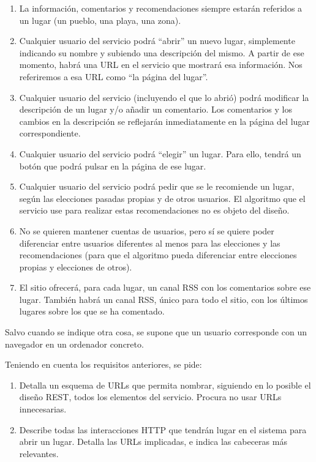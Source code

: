 {\begin{enumerate}
\item La información, comentarios y recomendaciones siempre estarán referidos a un lugar (un pueblo, una playa, una zona).
\item Cualquier usuario del servicio podrá ``abrir'' un nuevo lugar, simplemente indicando su nombre y subiendo una descripción del mismo. A partir de ese momento, habrá una URL en el servicio que  mostrará esa información. Nos referiremos a esa URL como ``la página del lugar''.
\item Cualquier usuario del servicio (incluyendo el que lo abrió) podrá modificar la descripción de un lugar y/o añadir un comentario. Los comentarios y los cambios en la descripción se reflejarán inmediatamente en la página del lugar correspondiente.
\item Cualquier usuario del servicio podrá ``elegir'' un lugar. Para ello, tendrá un botón que podrá pulsar en la página de ese lugar.
\item Cualquier usuario del servicio podrá pedir que se le recomiende un lugar, según las elecciones pasadas propias y de otros usuarios. El algoritmo que el servicio use para realizar estas recomendaciones no es objeto del diseño.
\item No se quieren mantener cuentas de usuarios, pero sí se quiere poder diferenciar entre usuarios diferentes al menos para las elecciones y las recomendaciones (para que el algoritmo pueda diferenciar entre elecciones propias y elecciones de otros).
\item El sitio ofrecerá, para cada lugar, un canal RSS con los comentarios sobre ese lugar. También  habrá un canal RSS, único para todo el sitio, con los últimos lugares sobre los que se ha comentado.
\end{enumerate}

Salvo cuando se indique otra cosa, se supone que un usuario corresponde con un navegador en un ordenador concreto.

Teniendo en cuenta los requisitos anteriores, se pide:

\begin{enumerate}
\item Detalla un esquema de URLs que permita nombrar, siguiendo en lo posible el diseño REST, todos los elementos del servicio. Procura no usar URLs innecesarias.

\item Describe todas las interacciones HTTP que tendrán lugar en el sistema
  para abrir un lugar. Detalla las URLs implicadas, e indica las cabeceras más
  relevantes.


\end{enumerate}}
